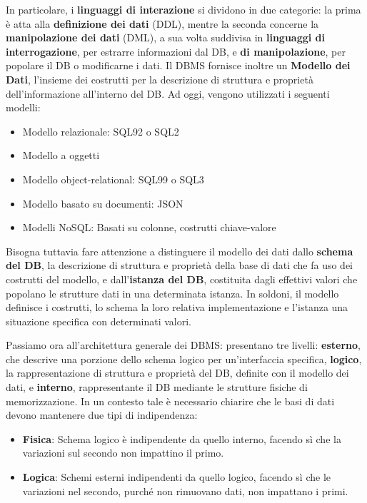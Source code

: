 \noindent In particolare, i \textbf{linguaggi di interazione} si dividono in due categorie: la prima è atta alla \textbf{definizione dei dati} (DDL),
mentre la seconda concerne la \textbf{manipolazione dei dati} (DML), a sua volta suddivisa in \textbf{linguaggi di interrogazione}, per estrarre
informazioni dal DB,  e \textbf{di manipolazione}, per popolare il DB o modificarne i dati. Il DBMS fornisce inoltre un \textbf{Modello dei Dati},
l'insieme dei costrutti per la descrizione di struttura e proprietà dell'informazione all'interno del DB. Ad oggi, vengono utilizzati i seguenti
modelli: \begin{itemize}
    \item Modello relazionale: SQL92 o SQL2
    \item Modello a oggetti
    \item Modello object-relational: SQL99 o SQL3
    \item Modello basato su documenti: JSON
    \item Modelli NoSQL: Basati su colonne, costrutti chiave-valore
\end{itemize}

\noindent Bisogna tuttavia fare attenzione a distinguere il modello dei dati dallo \textbf{schema del DB}, la descrizione di struttura e proprietà della
base di dati che fa uso dei costrutti del modello, e dall'\textbf{istanza del DB}, costituita dagli effettivi valori che popolano le strutture dati in
una determinata istanza. In soldoni, il modello definisce i costrutti, lo schema la loro relativa implementazione e l'istanza una situazione specifica
con determinati valori.\par
Passiamo ora all'architettura generale dei DBMS: presentano tre livelli: \textbf{esterno}, che descrive una porzione dello schema logico per
un'interfaccia specifica, \textbf{logico}, la rappresentazione di struttura e proprietà del DB, definite con il modello dei dati, e \textbf{interno},
rappresentante il DB mediante le strutture fisiche di memorizzazione. In un contesto tale è necessario chiarire che le basi di dati devono mantenere due
tipi di indipendenza: \begin{itemize}
    \item \textbf{Fisica}: Schema logico è indipendente da quello interno, facendo sì che la variazioni sul secondo non impattino il primo.
    \item \textbf{Logica}: Schemi esterni indipendenti da quello logico, facendo sì che le variazioni nel secondo, purché non rimuovano dati, non
	impattano i primi.
\end{itemize}

